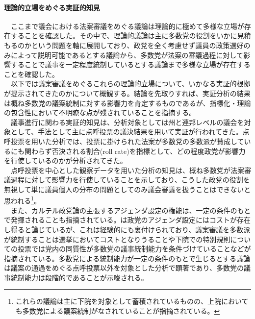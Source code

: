 \paragraph*{理論的立場をめぐる実証的知見}
　ここまで議会における法案審議をめぐる議論は理論的に極めて多様な立場が存在することを確認した。その中で、理論的議論は主に多数党の役割をいかに見積もるのかという問題を軸に展開しており、政党を全く考慮せず議員の政策選好のみによって説明可能であるとする議論\citep*{Krehbiel1998-ob,Krehbiel2010-ob}から、多数党が法案の審議過程に対して影響することで議事を一定程度統制しているとする議論\citep*{Aldrich1995-xf,Cox2005-pn,Cox2007-xq}まで多様な立場が存在することを確認した。\\
　以下では議案審議をめぐるこれらの理論的立場について、いかなる実証的根拠が提示されてきたのかについて概観する。結論を先取りすれば、実証分析の結果は概ね多数党の議案統制に対する影響力を肯定するものであるが、指標化・理論の包含性において不明瞭な点が残されていることを指摘する。\\
　議事進行に関わる実証的知見は、分析対象としては州と連邦レベルの議会を対象として、手法として主に点呼投票の議決結果を用いて実証が行われてきた。点呼投票を用いた分析では、投票に掛けられた法案が多数党の多数派が賛成しているにも関わらず否決される割合(roll rate)を指標として、どの程度政党が影響力を行使しているのかが分析されてきた。\citep{Magleby2018-rc,Richman2020-al}\\
　点呼投票を中心とした観察データを用いた分析の知見は、概ね多数党が法案審議過程に対して影響力を行使していることを示しており\citep*{Cox2001-eu,Lawrence2006-ed,Cox2010-gb,Meagher2012-to,Clark2012-lk}、こうした政党の役割を無視して単に議員個人の分布の問題としてのみ議会審議を扱うことはできないと思われる\footnote{これらの議論は主に下院を対象として蓄積されているものの、上院においても多数党による議案統制がなされていることが指摘されている。\citep*{Gailmard2007-yj,Hartog2008-xs}}。\\
　また、カルテル政党論の主張するアジェンダ設定の権能は、一定の条件のもとで発揮されることも指摘されている。\citet*[Ch6]{Cox2005-pn}は政党のアジェンダ設定にはコストが存在し得ると論じているが、これは経験的にも裏付けられており、議案審議を多数派が統制することは選挙においてコストとなりうること\citep*{Richman2015-xo}や下院での特別規則についての投票では党内の同質性が多数党の議事統制能力を条件づけていること\citep*{Finocchiaro2008-zh}などが指摘されている。多数党による統制能力が一定の条件のもとで生じるとする議論は議案の通過をめぐる点呼投票以外を対象とした分析で顕著であり、多数党の議事統制能力は段階的であることが示唆される。\\
